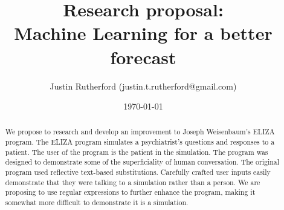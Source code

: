 

\title{Research proposal: \\ Machine Learning for a better forecast}
\author{Justin Rutherford (justin.t.rutherford@gmail.com)}
\date{\today}




  \maketitle

  \begin{abstract}
    We propose to research and develop an improvement to Joseph Weisenbaum's
    ELIZA program. The ELIZA program simulates a psychiatrist's questions and
    responses to a patient. The user of the program is the patient in the
    simulation. The program was designed to demonstrate some of the
    superficiality of human conversation. The original program used
    reflective text-based substitutions. Carefully crafted user inputs
    easily demonstrate that they were talking to a simulation rather than a
    person. We are proposing to use regular expressions to further enhance the
    program, making it somewhat more difficult to demonstrate it is a
    simulation.
  \end{abstract}

